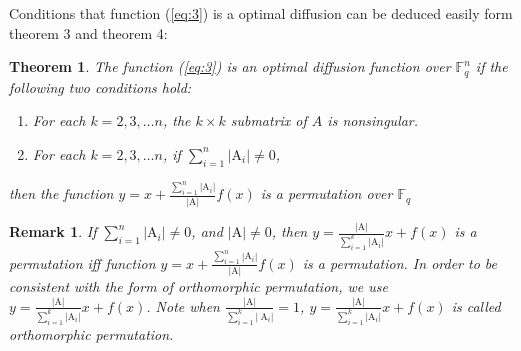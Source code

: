 \documentclass[12pt,a4paper]{article}
\newcommand{\0}{\textbf{0}}
\newcommand{\1}{\textbf{1}}
\newtheorem{theorem}{Theorem}
\newtheorem{remark}{Remark}
\begin{document}
    Conditions that function (\ref{eq:3}) is a optimal diffusion can be deduced easily form theorem 3 and theorem 4:
    \begin{theorem}
        The function (\ref{eq:3}) is an optimal diffusion function over $\mathbb{F}_{{q}}^{n}$ if the following two conditions hold:
        \begin{enumerate}[label=\arabic*)]
            \item For each $k=2,3, \dots n$, the $k \times k$ submatrix of $A$ is nonsingular.
            \item For each $k=2,3, \dots n$, if $\sum_{i=1}^{n}\left|\mathrm{A}_{i}\right| \neq 0$, 
        \end{enumerate}
        then the function ${y}=x+\frac{\sum_{i=1}^{n}\left|\mathrm{A}_{i}\right|}{|\mathrm{A}|} f(x)$ is a permutation over $\mathbb{F}_{{q}}$
    \end{theorem}
    \begin{remark}
        If $\sum_{i=1}^{n}\left|\mathrm{A}_{i}\right| \neq 0$, and $|\mathrm{A}| \neq 0$, 
        then ${y}=\frac{|\mathrm{A}|}{\sum_{i=1}^{k}\left|\mathrm{A}_{i}\right|} x+f(x)$ is a permutation iff function ${y}=x+\frac{\sum_{i=1}^{n}\left|\mathrm{A}_{i}\right|}{|\mathrm{A}|} f(x)$ is a permutation. 
        In order to be consistent with the form of orthomorphic permutation\cite{mann1942construction}, we use ${y}=\frac{|\mathrm{A}|}{\sum_{i=1}^{k}\left|\mathrm{A}_{i}\right|} x+f(x)$. 
        Note when $\frac{|\mathrm{A}|}{\sum_{i=1}^{k}\left|\mathrm{~A}_{i}\right|}=1$, $ {y}=\frac{|\mathrm{A}|}{\sum_{i=1}^{k}\left|\mathrm{A}_{i}\right|} x+f(x)$ is called orthomorphic permutation.
    \end{remark}
        
\end{document}
